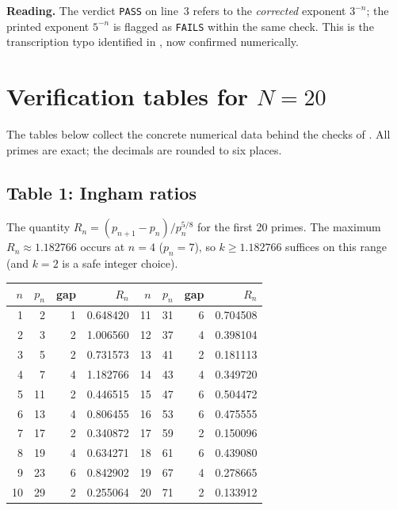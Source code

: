 \documentclass[11pt,reqno]{amsart}
\theoremstyle{redplain}
\numberwithin{equation}{section}
\begin{document}
\noindent\textbf{Reading.} The verdict \texttt{PASS} on line~3 refers to the
\emph{corrected} exponent $3^{-n}$; the printed exponent $5^{-n}$ is
flagged as \texttt{FAILS} within the same check. This is the transcription
typo identified in , now confirmed numerically.

\section{Verification tables for $N=20$}
\label{sec:tables}

The tables below collect the concrete numerical data behind the checks of
. All primes are exact; the decimals are rounded to six
places.

\subsection{Table 1: Ingham ratios}

The quantity $R_n=(p_{n+1}-p_n)/p_n^{5/8}$ for the first 20 primes. The
maximum $R_n\approx1.182766$ occurs at $n=4$ ($p_n=7$), so
$k\ge1.182766$ suffices on this range (and $k=2$ is a safe integer choice).

\begin{center}
\begin{tabular}{rrrr|rrrr}
\toprule
$n$ & $p_n$ & gap & $R_n$ & $n$ & $p_n$ & gap & $R_n$\\
\midrule
1 & 2 & 1 & 0.648420 & 11 & 31 & 6 & 0.704508 \\
2 & 3 & 2 & 1.006560 & 12 & 37 & 4 & 0.398104 \\
3 & 5 & 2 & 0.731573 & 13 & 41 & 2 & 0.181113 \\
4 & 7 & 4 & 1.182766 & 14 & 43 & 4 & 0.349720 \\
5 & 11 & 2 & 0.446515 & 15 & 47 & 6 & 0.504472 \\
6 & 13 & 4 & 0.806455 & 16 & 53 & 6 & 0.475555 \\
7 & 17 & 2 & 0.340872 & 17 & 59 & 2 & 0.150096 \\
8 & 19 & 4 & 0.634271 & 18 & 61 & 6 & 0.439080 \\
9 & 23 & 6 & 0.842902 & 19 & 67 & 4 & 0.278665 \\
10 & 29 & 2 & 0.255064 & 20 & 71 & 2 & 0.133912 \\
\bottomrule
\end{tabular}
\end{center}
\end{document}

